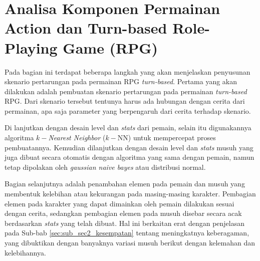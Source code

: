 \section{Analisa Komponen Permainan Action dan Turn-based Role-Playing Game (RPG)}
\label{sec:sec3_design_komponen}
\vspace{1ex}

Pada bagian ini terdapat beberapa langkah yang akan menjelaskan penyusunan skenario pertarungan pada permainan RPG \textit{turn-based}. Pertama yang akan dilakukan adalah pembuatan skenario pertarungan pada permainan \textit{turn-based} RPG. Dari skenario tersebut tentunya harus ada hubungan dengan cerita dari permainan, apa saja parameter yang berpengaruh dari cerita terhadap skenario.
\vspace{1ex}

Di lanjutkan dengan desain level dan \textit{stats} dari pemain, selain itu digunakannya algoritma $k-$\textit{Nearest Neighbor} ($k-$NN) untuk mempercepat proses pembuatannya. Kemudian dilanjutkan dengan desain level dan \textit{stats} musuh yang juga dibuat secara otomatis dengan algoritma yang sama dengan pemain, namun tetap dipolakan oleh \textit{gaussian naive bayes} atau distribusi normal. 
\vspace{1ex}

Bagian selanjutnya adalah penambahan elemen pada pemain dan musuh yang membentuk kelebihan atau kekurangan pada masing-masing karakter. Pembagian elemen pada karakter yang dapat dimainkan oleh pemain dilakukan sesuai dengan cerita, sedangkan pembagian elemen pada musuh disebar secara acak berdasarkan \textit{stats} yang telah dibuat. Hal ini berkaitan erat dengan penjelasan pada Sub-bab \ref{sec:sub_sec2_kesempatan} tentang meningkatnya keberagaman, yang dibuktikan dengan banyaknya variasi musuh berikut dengan kelemahan dan kelebihannya.
\vspace{1ex}

